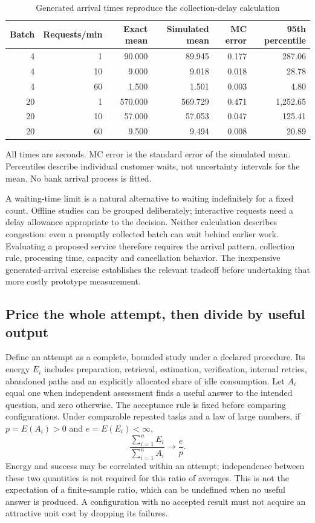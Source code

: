 \begin{table}[htbp]
\centering\small
\caption{Generated arrival times reproduce the collection-delay calculation}
\label{closure:batch-results}
\begin{tabular}{rrrrrr}
\toprule
Batch & Requests/min & Exact mean & Simulated mean & MC error & 95th percentile\\
\midrule
4&1&90.000&89.945&0.177&287.06\\
4&10&9.000&9.018&0.018&28.78\\
4&60&1.500&1.501&0.003&4.80\\
20&1&570.000&569.729&0.471&1,252.65\\
20&10&57.000&57.053&0.047&125.41\\
20&60&9.500&9.494&0.008&20.89\\
\bottomrule
\end{tabular}
\par\smallskip\footnotesize All times are seconds. MC error is the standard
error of the simulated mean. Percentiles describe individual customer waits,
not uncertainty intervals for the mean. No bank arrival process is fitted.
\end{table}

A waiting-time limit is a natural alternative to waiting indefinitely for a
fixed count. Offline studies can be grouped deliberately; interactive
requests need a delay allowance appropriate to the decision. Neither
calculation describes congestion: even a promptly collected batch can wait
behind earlier work. Evaluating a proposed service therefore requires the
arrival pattern, collection rule, processing time, capacity and cancellation
behavior. The inexpensive generated-arrival exercise establishes the relevant
tradeoff before undertaking that more costly prototype measurement.

\subsection{Price the whole attempt, then divide by useful output}

Define an attempt as a complete, bounded study under a declared procedure.
Its energy $E_i$ includes preparation, retrieval, estimation, verification,
internal retries, abandoned paths and an explicitly allocated share of
idle consumption. Let $A_i$ equal one when independent assessment finds a
useful answer to the intended question, and zero otherwise. The acceptance
rule is fixed before comparing configurations. Under comparable repeated
tasks and a law of large numbers, if $p=E(A_i)>0$ and $e=E(E_i)<\infty$,
\begin{equation}
 \frac{\sum_{i=1}^n E_i}{\sum_{i=1}^n A_i}
       \longrightarrow \frac{e}{p}.
 \label{closure:energy-useful}
\end{equation}
Energy and success may be correlated within an attempt; independence
between these two quantities is not required for this ratio of averages.
This is not the expectation of a finite-sample ratio, which can be undefined
when no useful answer is produced. A configuration with no accepted result
must not acquire an attractive unit cost by dropping its failures.

